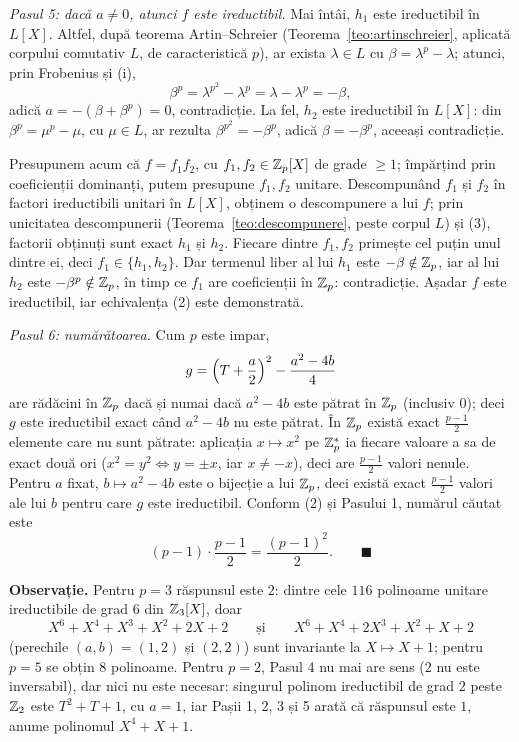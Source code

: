 \begin{solutie}
\emph{Pasul 5: dacă $a\neq0$, atunci $f$ este ireductibil.} Mai întâi, $h_1$ este ireductibil în $L[X]$. Altfel, după teorema Artin--Schreier (Teorema~\ref{teo:artinschreier}, aplicată corpului comutativ $L$, de caracteristică $p$), ar exista $\lambda\in L$ cu $\beta=\lambda^p-\lambda$; atunci, prin Frobenius și (i),
\[
  \beta^p=\lambda^{p^2}-\lambda^p=\lambda-\lambda^p=-\beta,
\]
adică $a=-(\beta+\beta^p)=0$, contradicție. La fel, $h_2$ este ireductibil în $L[X]$: din $\beta^p=\mu^p-\mu$, cu $\mu\in L$, ar rezulta $\beta^{p^2}=-\beta^p$, adică $\beta=-\beta^p$, aceeași contradicție.

Presupunem acum că $f=f_1f_2$, cu $f_1,f_2\in\mathbb{Z}_p[X]$ de grade $\ge1$; împărțind prin coeficienții dominanți, putem presupune $f_1,f_2$ unitare. Descompunând $f_1$ și $f_2$ în factori ireductibili unitari în $L[X]$, obținem o descompunere a lui $f$; prin unicitatea descompunerii (Teorema~\ref{teo:descompunere}, peste corpul $L$) și (3), factorii obținuți sunt exact $h_1$ și $h_2$. Fiecare dintre $f_1,f_2$ primește cel puțin unul dintre ei, deci $f_1\in\{h_1,h_2\}$. Dar termenul liber al lui $h_1$ este $-\beta\notin\mathbb{Z}_p$, iar al lui $h_2$ este $-\beta^p\notin\mathbb{Z}_p$, în timp ce $f_1$ are coeficienții în $\mathbb{Z}_p$: contradicție. Așadar $f$ este ireductibil, iar echivalența (2) este demonstrată.

\emph{Pasul 6: numărătoarea.} Cum $p$ este impar,
\[
  g=\Bigl(T+\frac a2\Bigr)^2-\frac{a^2-4b}{4}
\]
are rădăcini în $\mathbb{Z}_p$ dacă și numai dacă $a^2-4b$ este pătrat în $\mathbb{Z}_p$ (inclusiv $0$); deci $g$ este ireductibil exact când $a^2-4b$ nu este pătrat. În $\mathbb{Z}_p$ există exact $\frac{p-1}{2}$ elemente care nu sunt pătrate: aplicația $x\mapsto x^2$ pe $\mathbb{Z}_p^*$ ia fiecare valoare a sa de exact două ori ($x^2=y^2\iff y=\pm x$, iar $x\neq-x$), deci are $\frac{p-1}{2}$ valori nenule. Pentru $a$ fixat, $b\mapsto a^2-4b$ este o bijecție a lui $\mathbb{Z}_p$, deci există exact $\frac{p-1}{2}$ valori ale lui $b$ pentru care $g$ este ireductibil. Conform (2) și Pasului 1, numărul căutat este
\[
  (p-1)\cdot\frac{p-1}{2}=\frac{(p-1)^2}{2}. \qquad\blacksquare
\]

\medskip
\noindent\textbf{Observație.} Pentru $p=3$ răspunsul este $2$: dintre cele $116$ polinoame unitare ireductibile de grad $6$ din $\mathbb{Z}_3[X]$, doar
\[
  X^6+X^4+X^3+X^2+2X+2 \qquad\text{și}\qquad X^6+X^4+2X^3+X^2+X+2
\]
(perechile $(a,b)=(1,2)$ și $(2,2)$) sunt invariante la $X\mapsto X+1$; pentru $p=5$ se obțin $8$ polinoame. Pentru $p=2$, Pasul 4 nu mai are sens ($2$ nu este inversabil), dar nici nu este necesar: singurul polinom ireductibil de grad $2$ peste $\mathbb{Z}_2$ este $T^2+T+1$, cu $a=1$, iar Pașii 1, 2, 3 și 5 arată că răspunsul este $1$, anume polinomul $X^4+X+1$.


\end{solutie}

